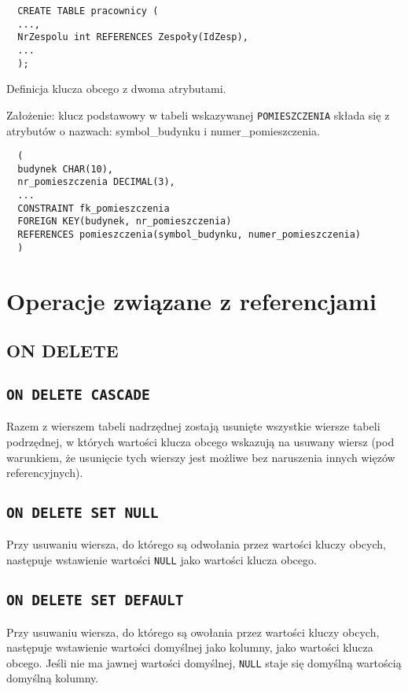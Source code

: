 \documentclass{article}
\begin{document}
\begin{verbatim}
  CREATE TABLE pracownicy (
  ...,
  NrZespolu int REFERENCES Zespoły(IdZesp),
  ...
  );
\end{verbatim}

Definicja klucza obcego z dwoma atrybutami.

Założenie: klucz podstawowy w tabeli wskazywanej {\tt POMIESZCZENIA} składa się z atrybutów o nazwach: symbol\_budynku i numer\_pomieszczenia.

\begin{verbatim}
  (
  budynek CHAR(10),
  nr_pomieszczenia DECIMAL(3),
  ...
  CONSTRAINT fk_pomieszczenia
  FOREIGN KEY(budynek, nr_pomieszczenia)
  REFERENCES pomieszczenia(symbol_budynku, numer_pomieszczenia)
  )
\end{verbatim}

\section{Operacje związane z referencjami}

\subsection{ON DELETE}

\subsection{\tt ON DELETE CASCADE}

Razem z wierszem tabeli nadrzędnej zostają usunięte wszystkie wiersze tabeli podrzędnej, w których wartości klucza obcego wskazują na usuwany wiersz (pod warunkiem, że usunięcie tych wierszy jest możliwe bez naruszenia innych więzów referencyjnych).

\subsection{\tt ON DELETE SET NULL}

Przy usuwaniu wiersza, do którego są odwołania przez wartości kluczy obcych, następuje wstawienie wartości \texttt{NULL} jako wartości klucza obcego.

\subsection{\tt ON DELETE SET DEFAULT}

Przy usuwaniu wiersza, do którego są owołania przez wartości kluczy obcych, następuje wstawienie wartości domyślnej jako kolumny, jako wartości klucza obcego. Jeśli nie ma jawnej wartości domyślnej, \texttt{NULL} staje się domyślną wartością domyślną kolumny.
\end{document}

